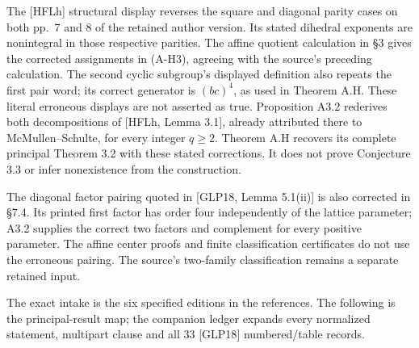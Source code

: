 \documentclass[
  11pt,
  a4paper,
]{article}
\newcounter{none} %
\begin{document}
The {[}HFLh{]} structural display reverses the square and diagonal
parity cases on both pp.~7 and 8 of the retained author version. Its
stated dihedral exponents are nonintegral in those respective parities.
The affine quotient calculation in §3 gives the corrected assignments in
(A-H3), agreeing with the source's preceding calculation. The second
cyclic subgroup's displayed definition also repeats the first pair word;
its correct generator is \((bc)^4\), as used in Theorem A.H. These
literal erroneous displays are not asserted as true. Proposition A3.2
rederives both decompositions of {[}HFLh, Lemma 3.1{]}, already
attributed there to McMullen--Schulte, for every integer \(q\ge2\).
Theorem A.H recovers its complete principal Theorem 3.2 with these
stated corrections. It does not prove Conjecture 3.3 or infer
nonexistence from the construction.

The diagonal factor pairing quoted in {[}GLP18, Lemma 5.1(ii){]} is also
corrected in §7.4. Its printed first factor has order four independently
of the lattice parameter; A3.2 supplies the correct two factors and
complement for every positive parameter. The affine center proofs and
finite classification certificates do not use the erroneous pairing. The
source's two-family classification remains a separate retained input.

The exact intake is the six specified editions in the references. The
following is the principal-result map; the companion ledger expands
every normalized statement, multipart clause and all 33 {[}GLP18{]}
numbered/table records.
\end{document}
